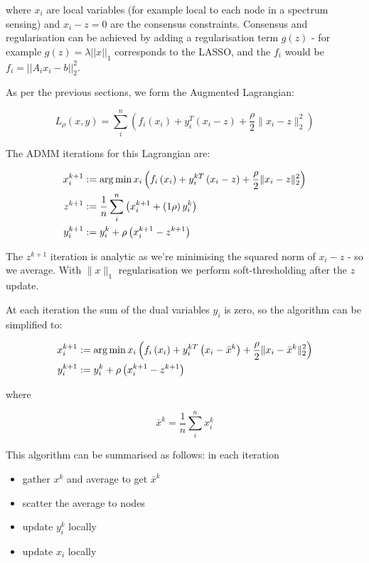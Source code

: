 \documentclass{article}
\begin{document}
where \(x_i\) are local variables (for example local to each node in a spectrum sensing) and \(x_i - z = 0\) are the consensus constraints. Consensus and regularisation can be achieved by adding a regularisation term \(g\left(z\right)\) - for example \(g\left(z\right) = \lambda||x||_1\) corresponds to the LASSO, and the \(f_i\) would be \(f_i = ||A_ix_i - b||_2^2\). 

As per the previous sections, we form the Augmented Lagrangian:

\begin{equation}
L_\rho\left(x,y\right) = \sum_i^n \left(f_i\left( x_i \right) + y_i^T\left(x_i-z\right) + \frac{\rho}{2}\|x_i-z\|_2^2\right)
\end{equation}

The ADMM iterations for this Lagrangian are:

\begin{align}
x_i^{k+1} &:= \operatorname*{arg\,min}{x_i} \left(f_i\left( x_i \right) + y_i^{kT}\left(x_i-z\right) + \frac{\rho}{2}\|x_i-z\|_2^2\right)\\
z^{k+1} &:= \frac{1}{n}\sum_i^n \left(x_i^{k+1} + \left(1\rho\right)y_i^k\right)\\
y_i^{k+1} &:= y_i^{k} + \rho \left(x_i^{k+1} - z^{k+1} \right)
\label{consensus_iterations}
\end{align}

The \(z^{k+1}\) iteration is analytic as we're minimising the squared norm of \(x_i - z\) - so we average. With \(\|x\|_1\) regularisation we perform soft-thresholding after the \(z\) update.

At each iteration the sum of the dual variables \(y_i\) is zero, so the algorithm can be simplified to:

\begin{align}
x_i^{k+1} &:= \operatorname*{arg\,min}{x_i} \left(f_i\left( x_i \right) + y_i^{kT}\left(x_i-\bar{x}^k\right) + \frac{\rho}{2}\|x_i-\bar{x}^k\|_2^2\right)\\
y_i^{k+1} &:= y_i^{k} + \rho \left(x_i^{k+1} - z^{k+1} \right)
\label{simple_consensus_iterations}
\end{align}
 
where

\begin{equation}
\bar{x}^k = \frac{1}{n} \sum_i^n x_i^k
\end{equation}

This algorithm can be summarised as follows: in each iteration

\begin{itemize}
\item gather \(x^k\) and average to get \(\bar{x}^k\)
\item scatter the average to nodes
\item update \(y_i^k\) locally
\item update \(x_i\) locally
\end{itemize}
\end{document}
